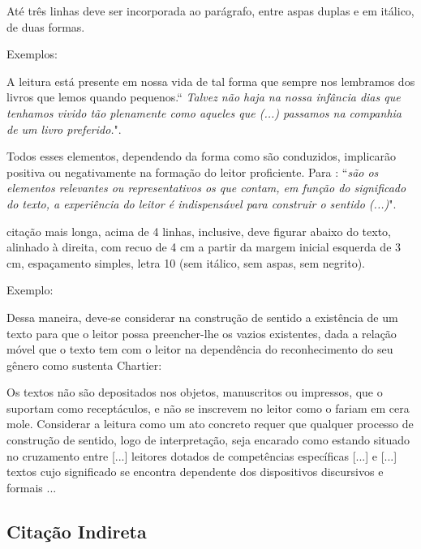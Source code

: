 \documentclass[
	12pt,				%
	openright,			%
	oneside,			%
	a4paper,			%
	english,			%
	french,				%
	spanish,			%
	brazil				%
	]{abntex2}
\begin{document}
\begin{alineas}
\item Até três linhas deve ser incorporada ao parágrafo, entre aspas duplas e em itálico, de duas formas. 

\par Exemplos:

\par A leitura está presente em nossa vida de tal forma que sempre nos lembramos dos livros que lemos quando pequenos.``\textit{ Talvez não haja na nossa infância dias que tenhamos vivido tão plenamente como aqueles que (...) passamos na companhia de um livro preferido.}"\cite{Pupo2003}.

Todos esses elementos, dependendo da forma como são conduzidos, implicarão positiva ou negativamente na formação do leitor proficiente. Para : ``\textit{são os elementos relevantes ou representativos os que contam, em função do significado do texto, a experiência do leitor é indispensável para construir o sentido (...)}". 

\item citação mais longa, acima de 4 linhas, inclusive, deve figurar abaixo do texto, alinhado à direita, com recuo de 4 cm a partir da margem inicial esquerda de 3 cm, espaçamento simples,  letra 10 (sem itálico, sem aspas, sem negrito). 
\par Exemplo:
\par Dessa maneira, deve-se considerar na construção de sentido a existência de um texto para que o leitor possa preencher-lhe os vazios existentes, dada a relação móvel que o texto tem com o leitor na dependência do reconhecimento do seu gênero como sustenta Chartier: 

\begin{citacao}

Os textos não são depositados nos objetos, manuscritos ou impressos, que o suportam como receptáculos, e não se inscrevem no leitor como o fariam em cera mole. Considerar a leitura como um ato concreto requer que qualquer processo de construção de sentido, logo de interpretação, seja encarado como estando situado no cruzamento entre [...] leitores dotados de competências específicas [...] e [...] textos cujo significado se encontra dependente dos dispositivos discursivos e formais ... \cite{Chartier1999}
\end{citacao}

\end{alineas}

\subsection{Citação Indireta}
\end{document}
